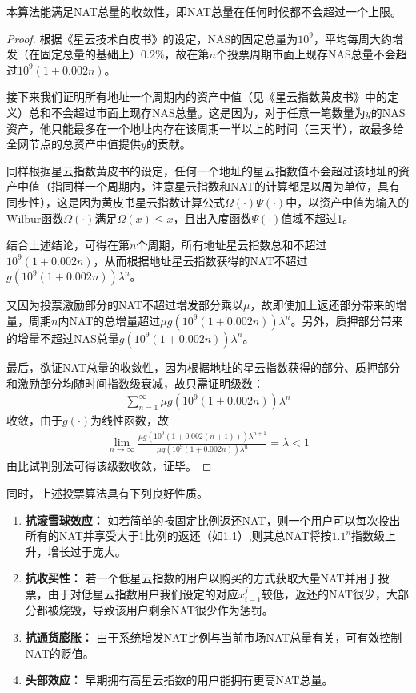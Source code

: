 \begin{property}
本算法能满足NAT总量的收敛性，即NAT总量在任何时候都不会超过一个上限。
\end{property}
\begin{proof}
	根据《星云技术白皮书》的设定，NAS的固定总量为$10^9$，平均每周大约增发（在固定总量的基础上）$0.2\%$，故在第$n$个投票周期市面上现存NAS总量不会超过$10^9(1+0.002n)$。
	
	接下来我们证明所有地址一个周期内的资产中值（见《星云指数黄皮书》中的定义）总和不会超过市面上现存NAS总量。这是因为，对于任意一笔数量为$y$的NAS资产，他只能最多在一个地址内存在该周期一半以上的时间（三天半），故最多给全网节点的总资产中值提供$y$的贡献。
	
	同样根据星云指数黄皮书的设定，任何一个地址的星云指数值不会超过该地址的资产中值（指同样一个周期内，注意星云指数和NAT的计算都是以周为单位，具有同步性），这是因为黄皮书星云指数计算公式$\Omega(\cdot)\Psi(\cdot)$中，以资产中值为输入的Wilbur函数$\Omega(\cdot)$满足$\Omega(x)\leq x$，且出入度函数$\Psi(\cdot)$值域不超过1。
	
	结合上述结论，可得在第$n$个周期，所有地址星云指数总和不超过$10^9(1+0.002n)$，从而根据地址星云指数获得的NAT不超过$g(10^9(1+0.002n))\lambda^n$。
	
	又因为投票激励部分的NAT不超过增发部分乘以$\mu$，故即使加上返还部分带来的增量，周期$n$内NAT的总增量超过$\mu g(10^9(1+0.002n))\lambda^n$。另外，质押部分带来的增量不超过NAS总量$g(10^9(1+0.002n))\lambda^n$。
	
	最后，欲证NAT总量的收敛性，因为根据地址的星云指数获得的部分、质押部分和激励部分均随时间指数级衰减，故只需证明级数：
	\begin{align}
	\sum_{n=1}^{\infty} \mu g(10^9(1+0.002n))\lambda^n
	\end{align}
	收敛，由于$g(\cdot)$为线性函数，故
	\begin{align}
	\lim_{n\rightarrow \infty} \frac{\mu g(10^9(1+0.002(n+1)))\lambda^{n+1}}{\mu g(10^9(1+0.002n))\lambda^n} = \lambda <1
	\end{align}
	由比试判别法可得该级数收敛，证毕。
\end{proof}
同时，上述投票算法具有下列良好性质。
\begin{enumerate}
	\item \textbf{抗滚雪球效应：} 如若简单的按固定比例返还NAT，则一个用户可以每次投出所有的NAT并享受大于1比例的返还（如1.1）,则其总NAT将按$1.1^n$指数级上升，增长过于庞大。
	\item \textbf{抗收买性：} 若一个低星云指数的用户以购买的方式获取大量NAT并用于投票，由于对低星云指数用户我们设定的对应$x_{i-1}^j$较低，返还的NAT很少，大部分都被烧毁，导致该用户剩余NAT很少作为惩罚。
	\item \textbf{抗通货膨胀：} 由于系统增发NAT比例与当前市场NAT总量有关，可有效控制NAT的贬值。
	\item \textbf{头部效应：} 早期拥有高星云指数的用户能拥有更高NAT总量。
\end{enumerate}